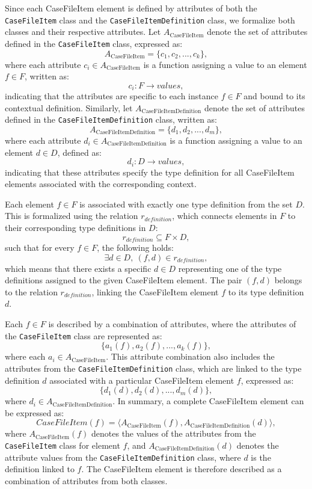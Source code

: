 \documentclass{article}
\begin{document}
Since each CaseFileItem element is defined by attributes of both the \texttt{CaseFileItem} class and the \texttt{CaseFileItemDefinition} class, we formalize both classes and their respective attributes. Let \( A_{\text{CaseFileItem}} \) denote the set of attributes defined in the \texttt{CaseFileItem} class, expressed as:
\[
A_{\text{CaseFileItem}} = \{ c_1, c_2, ..., c_k \},
\]
where each attribute \( c_i \in A_{\text{CaseFileItem}} \) is a function assigning a value to an element \( f \in F \), written as:
\[
c_i: F \rightarrow values,
\]
indicating that the attributes are specific to each instance \( f \in F \) and bound to its contextual definition. Similarly, let \( A_{\text{CaseFileItemDefinition}} \) denote the set of attributes defined in the \texttt{CaseFileItemDefinition} class, written as:
\[
A_{\text{CaseFileItemDefinition}} = \{ d_1, d_2, ..., d_m \},
\]
where each attribute \( d_i \in A_{\text{CaseFileItemDefinition}} \) is a function assigning a value to an element \( d \in D \), defined as:
\[
d_i: D \rightarrow values,
\]
indicating that these attributes specify the type definition for all CaseFileItem elements associated with the corresponding context.

Each element \( f \in F \) is associated with exactly one type definition from the set \( D \). This is formalized using the relation \( r_{definition} \), which connects elements in \( F \) to their corresponding type definitions in \( D \):
\[
r_{definition} \subseteq F \times D,
\]
such that for every \( f \in F \), the following holds:
\[
\exists d \in D,\ (f, d) \in r_{definition},
\]
which means that there exists a specific \( d \in D \) representing one of the type definitions assigned to the given CaseFileItem element. The pair \( (f, d) \) belongs to the relation \( r_{definition} \), linking the CaseFileItem element \( f \) to its type definition \( d \).

Each \( f \in F \) is described by a combination of attributes, where the attributes of the \texttt{CaseFileItem} class are represented as:
\[
\{ a_1(f), a_2(f), ..., a_k(f) \},
\]
where each \( a_i \in A_{\text{CaseFileItem}} \). This attribute combination also includes the attributes from the \texttt{CaseFileItemDefinition} class, which are linked to the type definition \( d \) associated with a particular CaseFileItem element \( f \), expressed as:
\[
\{ d_1(d), d_2(d), ..., d_m(d) \},
\]
where \( d_i \in A_{\text{CaseFileItemDefinition}} \). In summary, a complete CaseFileItem element can be expressed as:
\[
CaseFileItem(f) = \langle A_{\text{CaseFileItem}}(f), A_{\text{CaseFileItemDefinition}}(d) \rangle,
\]
where \( A_{\text{CaseFileItem}}(f) \) denotes the values of the attributes from the \texttt{CaseFileItem} class for element \( f \), and \( A_{\text{CaseFileItemDefinition}}(d) \) denotes the attribute values from the \texttt{CaseFileItemDefinition} class, where \( d \) is the definition linked to \( f \). The CaseFileItem element is therefore described as a combination of attributes from both classes.
\end{document}
